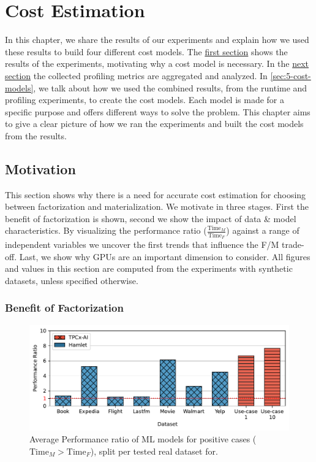 
\chapter{Cost Estimation}

\label{chapter:cost-estimation}
In this chapter, we share the results of our experiments and explain how we used these results to build four different cost models. The \hyperref[sec:5-motivation]{first section} shows the results of the experiments, motivating why a cost model is necessary. In the \hyperref[sec:5-gpu-performance-analysis]{next section} the collected profiling metrics are aggregated and analyzed. In \autoref{sec:5-cost-models}, we talk about how we used the combined results, from the runtime and profiling experiments, to create the cost models. Each model is made for a specific purpose and offers different ways to solve the problem. This chapter aims to give a clear picture of how we ran the experiments and built the cost models from the results.

\section{Motivation}
\label{sec:5-motivation}
This section shows why there is a need for accurate cost estimation for choosing between factorization and materialization. We motivate in three stages. First the benefit of factorization is shown, second we show the impact of data \& model characteristics. By visualizing the performance ratio ($\frac{\text{Time}_M}{\text{Time}_F}$) against a range of independent variables we uncover the first trends that influence the F/M trade-off. Last, we show why GPUs are an important dimension to consider. All figures and values in this section are computed from the experiments with synthetic datasets, unless specified otherwise.

\subsection{Benefit of Factorization}
\begin{figure}[ht]
    \centering
    \includegraphics[width=\linewidth]{chapters/05_cost_estimation/figures/real_datasets_speedup.pdf}
    \caption[Performance gain with factorization on real datasets]{Average Performance ratio of ML models for positive cases ($\text{Time}_M > \text{Time}_F$), split per tested real dataset for.}
    \label{fig:5-real-perf-ratio}
\end{figure}

